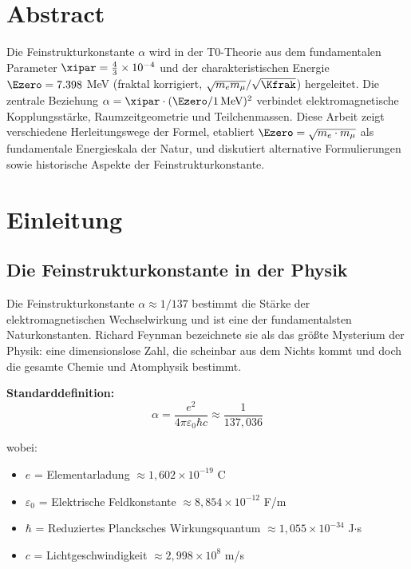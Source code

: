 \section*{Abstract}
		Die Feinstrukturkonstante $\alpha$ wird in der T0-Theorie aus dem fundamentalen Parameter $\xipar = \frac{4}{3} \times 10^{-4}$ und der charakteristischen Energie $\Ezero = 7.398$ MeV (fraktal korrigiert, $\sqrt{m_e m_\mu}/\sqrt{\Kfrak}$) hergeleitet. Die zentrale Beziehung $\alpha = \xipar \cdot (\Ezero/1\,\text{MeV})^2$ verbindet elektromagnetische Kopplungsstärke, Raumzeitgeometrie und Teilchenmassen. Diese Arbeit zeigt verschiedene Herleitungswege der Formel, etabliert $\Ezero = \sqrt{m_e \cdot m_\mu}$ als fundamentale Energieskala der Natur, und diskutiert alternative Formulierungen sowie historische Aspekte der Feinstrukturkonstante.

	
	
	
	
	\section{Einleitung}
	
	\subsection{Die Feinstrukturkonstante in der Physik}
	
	Die Feinstrukturkonstante $\alpha \approx 1/137$ bestimmt die Stärke der elektromagnetischen Wechselwirkung und ist eine der fundamentalsten Naturkonstanten. Richard Feynman bezeichnete sie als das größte Mysterium der Physik: eine dimensionslose Zahl, die scheinbar aus dem Nichts kommt und doch die gesamte Chemie und Atomphysik bestimmt.
	
	\textbf{Standarddefinition:}
	\begin{equation}
		\alpha = \frac{e^2}{4\pi\varepsilon_0\hbar c} \approx \frac{1}{137{,}036}
	\end{equation}
	
	wobei:
	\begin{itemize}
		\item $e$ = Elementarladung $\approx 1{,}602 \times 10^{-19}$ C
		\item $\varepsilon_0$ = Elektrische Feldkonstante $\approx 8{,}854 \times 10^{-12}$ F/m
		\item $\hbar$ = Reduziertes Plancksches Wirkungsquantum $\approx 1{,}055 \times 10^{-34}$ J$\cdot$s
		\item $c$ = Lichtgeschwindigkeit $\approx 2{,}998 \times 10^8$ m/s
	\end{itemize}
	
